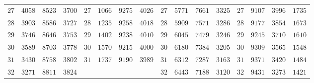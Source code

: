 \begin{center}
\begin{tabular}{r|r|r|r||r|r|r|r||r|r|r|r||r|r|r|r}
$27$ & $4058$ & $8523$ & $3700$ & $27$ & $1066$ & $9275$ & $4026$ & $27$ & $5771$ & $7661$ & $3325$ & $27$ & $9107$ & $3996$ & $1735$\\
$28$ & $3903$ & $8586$ & $3727$ & $28$ & $1235$ & $9258$ & $4018$ & $28$ & $5909$ & $7571$ & $3286$ & $28$ & $9177$ & $3854$ & $1673$\\
$29$ & $3746$ & $8646$ & $3753$ & $29$ & $1402$ & $9238$ & $4010$ & $29$ & $6045$ & $7479$ & $3246$ & $29$ & $9245$ & $3710$ & $1610$\\
$30$ & $3589$ & $8703$ & $3778$ & $30$ & $1570$ & $9215$ & $4000$ & $30$ & $6180$ & $7384$ & $3205$ & $30$ & $9309$ & $3565$ & $1548$\\[3pt]
$31$ & $3430$ & $8758$ & $3802$ & $31$ & $1737$ & $9190$ & $3989$ & $31$ & $6312$ & $7287$ & $3163$ & $31$ & $9371$ & $3420$ & $1484$\\
$32$ & $3271$ & $8811$ & $3824$ &  &  &  &  & $32$ & $6443$ & $7188$ & $3120$ & $32$ & $9431$ & $3273$ & $1421$\\
\end{tabular}\endgroup
\end{center}
\clearpage
{}%
